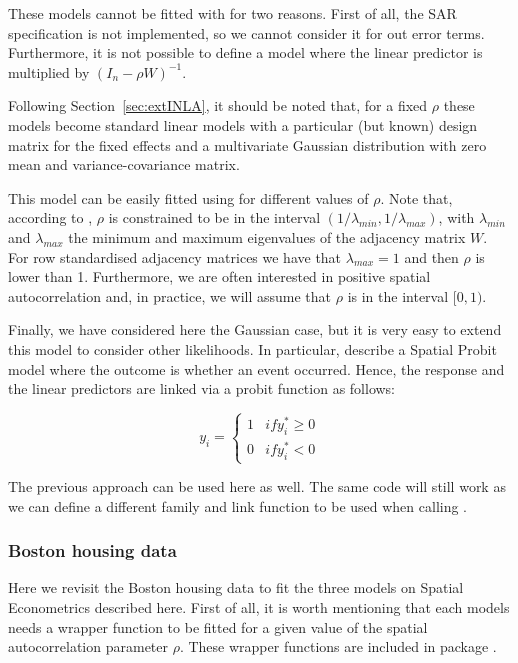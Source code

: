 \documentclass[article]{jss}
\begin{document}
These models cannot be fitted with  for two reasons. First of all, 
the SAR specification is not implemented, so we cannot consider it for out
error terms. Furthermore, it is not possible to define a model 
where the linear predictor is multiplied by $(I_n-\rho W)^{-1}$.

Following Section~\ref{sec:extINLA}, it should be noted that, for a fixed
$\rho$ these models become standard linear models with a particular 
(but known) design matrix for the fixed effects and a multivariate Gaussian
distribution with zero mean and variance-covariance matrix.

This model can be easily fitted using  for different values
of $\rho$. Note that, according to \citet{Haining:2003}, $\rho$ is constrained 
to be in the interval $(1/\lambda_{min}, 1/\lambda_{max})$, with
$\lambda_{min}$ and $\lambda_{max}$ the minimum and maximum eigenvalues of
the adjacency matrix $W$. For row standardised adjacency matrices we have that
$\lambda_{max}=1$ and then $\rho$ is lower than 1. Furthermore, we are often
interested in positive spatial autocorrelation and, in practice, we will
assume that $\rho$ is in the interval $[0,1)$.


Finally, we have considered here the Gaussian case, but it is very easy to
extend this model to consider other likelihoods. In particular,
\citet{LeSageetal:2011} describe a Spatial Probit model where the outcome is
whether an event occurred. Hence, the response and the linear predictors are
linked via a probit function as follows:

$$
y_i=
\left\{
\begin{array}{cc}
1 & if y^*_i\geq 0\\
0 & if y^*_i < 0
\end{array}
\right.
$$

The previous approach can be used here as well. The same code will still work
as we can define a different family and link function to be used when calling
.

\subsubsection{Boston housing data}

Here we revisit the Boston housing data to fit the three models on Spatial
Econometrics described here. First of all, it is worth mentioning that each
models needs a wrapper function to be fitted for a given value of the
spatial autocorrelation parameter $\rho$. These wrapper functions are
included in  package .
\end{document}
